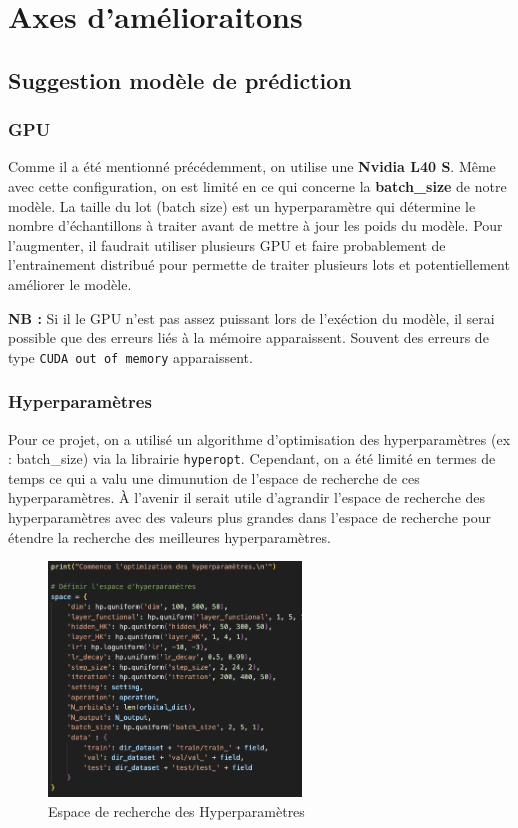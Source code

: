 \section{Axes d'amélioraitons}

\subsection{Suggestion modèle de prédiction}

\subsubsection{GPU}

Comme il a été mentionné précédemment, on utilise une \textbf{Nvidia L40 S}.
Même avec cette configuration, on est limité en ce qui concerne la \textbf{batch\_size} de notre modèle. 
La taille du lot (batch size) est un hyperparamètre qui détermine le nombre d'échantillons à traiter avant de mettre à jour les poids du modèle.
Pour l'augmenter, il faudrait utiliser plusieurs GPU et faire probablement de l'entrainement distribué pour permette de traiter plusieurs lots et potentiellement améliorer le modèle.

\textbf{NB :} Si il le GPU n'est pas assez puissant lors de l'exéction du modèle, il serai possible que des erreurs liés à la mémoire apparaissent. Souvent des erreurs de type \texttt{CUDA out of memory} apparaissent.

\subsubsection{Hyperparamètres}
Pour ce projet, on a utilisé un algorithme d'optimisation des hyperparamètres (ex : batch\_size) via la librairie \texttt{hyperopt}.
Cependant, on a été limité en termes de temps ce qui a valu une dimunution de l'espace de recherche de ces hyperparamètres.  
À l'avenir il serait utile d'agrandir l'espace de recherche des hyperparamètres avec des valeurs plus grandes dans l'espace de recherche pour étendre la recherche des meilleures hyperparamètres.

\begin{figure}[H]
    \centering
    \includegraphics[width=0.6\textwidth]{Overview/hyper.png}
    \caption{Espace de recherche des Hyperparamètres}
\end{figure}

